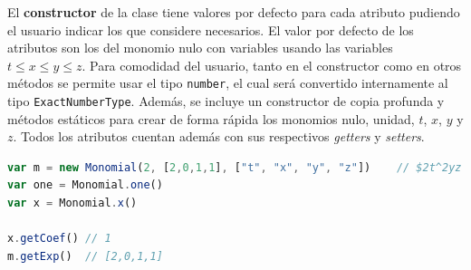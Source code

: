 El \textbf{constructor} de la clase tiene valores por defecto para cada atributo pudiendo el usuario indicar los que considere necesarios. El valor por defecto de los atributos son los del monomio nulo con variables usando las variables $t\le x\le y\le z$. Para comodidad del usuario, tanto en el constructor como en otros métodos se permite usar el tipo \texttt{number}, el cual será convertido internamente al tipo \texttt{ExactNumberType}. Además, se incluye un constructor de copia profunda y métodos estáticos para crear de forma rápida los monomios nulo, unidad, $t$, $x$, $y$ y $z$. Todos los atributos cuentan además con sus respectivos \textit{getters} y \textit{setters}.
\begin{lstlisting}[language=Javascript]
var m = new Monomial(2, [2,0,1,1], ["t", "x", "y", "z"])    // $2t^2yz en Q[t,x,y,z]$
var one = Monomial.one()
var x = Monomial.x()

x.getCoef() // 1
m.getExp()  // [2,0,1,1]
\end{lstlisting}

